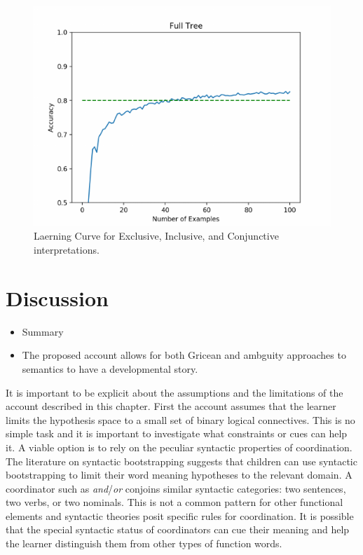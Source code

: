 \documentclass[oneside]{report}
\theoremstyle{definition}
\theoremstyle{definition}
\theoremstyle{definition}
\theoremstyle{remark}
\begin{document}
\begin{figure}[tb]

{\centering \includegraphics{figs/everythingLearning-1} 

}

\caption{Laerning Curve for Exclusive, Inclusive, and Conjunctive interpretations.}\label{fig:everythingLearning}
\end{figure}
\section{Discussion}\label{discussion-5}
\begin{itemize}
\item
  Summary
\item
  The proposed account allows for both Gricean and ambguity approaches
  to semantics to have a developmental story.
\end{itemize}
It is important to be explicit about the assumptions and the limitations
of the account described in this chapter. First the account assumes that
the learner limits the hypothesis space to a small set of binary logical
connectives. This is no simple task and it is important to investigate
what constraints or cues can help it. A viable option is to rely on the
peculiar syntactic properties of coordination. The literature on
syntactic bootstrapping suggests that children can use syntactic
bootstrapping to limit their word meaning hypotheses to the relevant
domain. A coordinator such as \emph{and}/\emph{or} conjoins similar
syntactic categories: two sentences, two verbs, or two nominals. This is
not a common pattern for other functional elements and syntactic
theories posit specific rules for coordination. It is possible that the
special syntactic status of coordinators can cue their meaning and help
the learner distinguish them from other types of function words.
\end{document}

